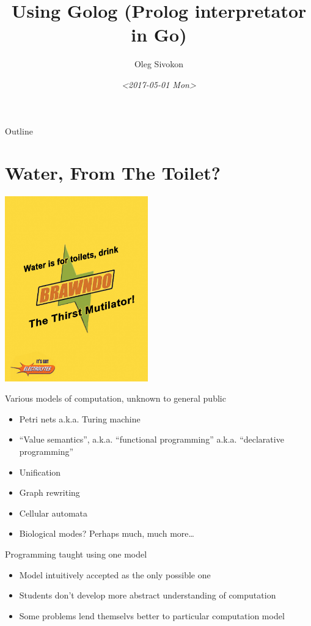 \documentclass[presentation]{beamer}
\author{Oleg Sivokon}
\date{\textit{<2017-05-01 Mon>}}
\title{Using Golog (Prolog interpretator in Go)}
\begin{document}
\maketitle
\begin{frame}{Outline}
\tableofcontents
\end{frame}


\section{Water, From The Toilet?}
\label{sec-1}
\includegraphics[height=8cm]{./images/water-from-toilet.jpg}

\begin{frame}[label=sec-1-1]{Various models of computation, unknown to general public}
\begin{itemize}
\item Petri nets a.k.a. Turing machine
\item ``Value semantics'', a.k.a. ``functional programming''
a.k.a. ``declarative programming''
\item Unification
\item Graph rewriting
\item Cellular automata
\item Biological modes? Perhaps much, much more\ldots{}
\end{itemize}
\end{frame}

\begin{frame}[label=sec-1-2]{Programming taught using one model}
\begin{itemize}
\item Model intuitively accepted as the only possible one
\item Students don't develop more abstract understanding of computation
\item Some problems lend themselvs better to particular computation
model
\end{itemize}
\end{frame}
\end{document}
